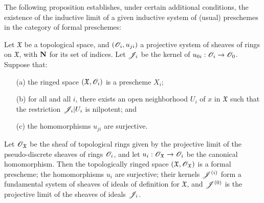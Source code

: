 The following proposition establishes, under certain additional conditions, the existence of the inductive limit of a given inductive system of (usual) preschemes in the category of formal preschemes:
\begin{proposition}[10.6.3]
\label{I.10.6.3}
Let $\mathfrak{X}$ be a topological space, and $(\mathscr{O}_i,u_{ji})$ a projective system of sheaves of rings on $\mathfrak{X}$, with $\mathbf{N}$ for its set of indices.
Let $\mathscr{J}_i$ be the kernel of $u_{0i}:\sh{O}_i\to\sh{O}_0$.
Suppose that:
\begin{enumerate}
  \item[\rm{(a)}] the ringed space $(\mathfrak{X},\mathscr{O}_i)$ is a prescheme $X_i$;
  \item[\rm{(b)}] for all  and all $i$, there exists an open neighborhood $U_i$ of $x$ in $\mathfrak{X}$ such that the restriction $\mathscr{J}_i|U_i$ is nilpotent; and
  \item[\rm{(c)}] the homomorphisms $u_{ji}$ are surjective.
\end{enumerate}

Let $\mathscr{O}_\mathfrak{X}$ be the sheaf of topological rings given by the projective limit of the pseudo-discrete sheaves of rings $\mathscr{O}_i$, and let $u_i:\sh{O}_\mathfrak{X}\to\sh{O}_i$ be the canonical homomorphism.
Then the topologically ringed space $(\mathfrak{X},\mathscr{O}_\mathfrak{X})$ is a formal prescheme; the homomorphisms $u_i$ are surjective; their kernels $\mathscr{J}^{(i)}$ form a fundamental system of sheaves of ideals of definition for $\mathfrak{X}$, and $\mathscr{J}^{(0)}$ is the projective limit of the sheaves of ideals $\mathscr{J}_i$.
\end{proposition}


